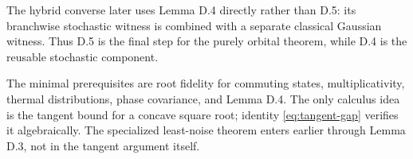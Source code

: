 \documentclass[11pt]{article}
\begin{document}
The hybrid converse later uses Lemma D.4 directly rather than D.5: its
branchwise stochastic witness is combined with a separate classical Gaussian
witness.  Thus D.5 is the final step for the purely orbital theorem, while
D.4 is the reusable stochastic component.

The minimal prerequisites are root fidelity for commuting states,
multiplicativity, thermal distributions, phase covariance, and Lemma D.4.
The only calculus idea is the tangent bound for a concave square root;
identity \eqref{eq:tangent-gap} verifies it algebraically.  The specialized
least-noise theorem enters earlier through Lemma D.3, not in the tangent
argument itself.
\end{document}
